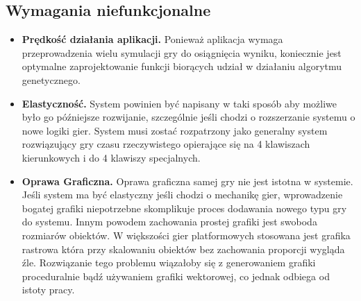 \subsection{Wymagania niefunkcjonalne}
	\begin{itemize}
	\item {\bf Prędkość działania aplikacji. }	
	\newline
	Ponieważ aplikacja wymaga przeprowadzenia wielu symulacji gry do osiągnięcia wyniku, koniecznie jest optymalne zaprojektowanie funkcji biorących udział w działaniu algorytmu genetycznego.
	\item {\bf Elastyczność. }
	\newline
	System powinien być napisany w taki sposób aby możliwe było go późniejsze rozwijanie, szczególnie jeśli chodzi o rozszerzanie systemu o nowe logiki gier.
	System musi zostać rozpatrzony jako generalny system rozwiązujący gry czasu rzeczywistego opierające się na 4 klawiszach kierunkowych i do 4 klawiszy specjalnych.
	\item {\bf Oprawa Graficzna. }
	\newline
	Oprawa graficzna samej gry nie jest istotna w systemie. Jeśli system ma być elastyczny jeśli chodzi o mechanikę gier, wprowadzenie bogatej grafiki niepotrzebne skomplikuje proces dodawania nowego typu gry do systemu. 
	Innym powodem zachowania prostej grafiki jest swoboda rozmiarów obiektów. 
	W większości gier platformowych stosowana jest grafika rastrowa która przy skalowaniu obiektów bez zachowania proporcji wygląda źle.
	Rozwiązanie tego problemu wiązałoby się z generowaniem grafiki proceduralnie bądź używaniem grafiki wektorowej, co jednak odbiega od istoty pracy.
	\end{itemize}


